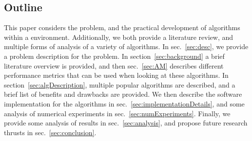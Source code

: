\subsection{Outline}
\label{sec:out}
This paper considers the \KS problem, and the practical development of algorithms within a \CC environment. Additionally, we both provide a literature review, and multiple forms of analysis of a variety of algorithms. In sec.~\ref{sec:desc}, we provide a problem description for the \KS problem. In section~\ref{sec:background} a brief literature overview is provided, and then sec.~\ref{sec:AM} describes different performance metrics that can be used when looking at these algorithms. In section~\ref{sec:algDescription}, multiple popular \KS algorithms are described, and a brief list of benefits and drawbacks are provided. We then describe the software implementation for the algorithms in sec.~\ref{sec:implementationDetails}, and some analysis of numerical experiments in sec.~\ref{sec:numExperiments}. Finally, we provide some analysis of results in sec.~\ref{sec:analysis}, and propose future research thrusts in sec.~\ref{sec:conclusion}.

